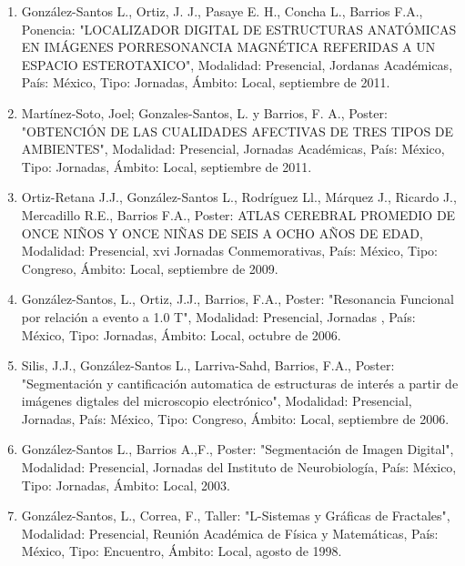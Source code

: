 \begin{enumerate}
\item  González-Santos L., Ortiz, J. J., Pasaye E. H., Concha L., Barrios F.A., Ponencia: "LOCALIZADOR DIGITAL DE ESTRUCTURAS 
ANATÓMICAS EN IMÁGENES PORRESONANCIA MAGNÉTICA REFERIDAS A UN ESPACIO ESTEROTAXICO", Modalidad: Presencial, Jordanas 
Académicas, País: México, Tipo: Jornadas, Ámbito: Local, septiembre de 2011.

\item  Martínez-Soto, Joel; Gonzales-Santos, L. y Barrios, F. A., Poster: "OBTENCIÓN DE LAS CUALIDADES AFECTIVAS DE TRES 
TIPOS DE 
AMBIENTES", Modalidad: Presencial, Jornadas Académicas, País: México, Tipo: Jornadas, Ámbito: Local, septiembre de 2011.

\item  Ortiz-Retana J.J., González-Santos L., Rodríguez Ll., Márquez J., Ricardo J., Mercadillo R.E., Barrios F.A., Poster: 
ATLAS 
CEREBRAL PROMEDIO DE ONCE NIÑOS Y ONCE NIÑAS DE SEIS A OCHO AÑOS DE EDAD, Modalidad: Presencial, xvi Jornadas Conmemorativas, 
País: México, Tipo: Congreso, Ámbito: Local, septiembre de 2009.

\item  González-Santos, L., Ortiz, J.J., Barrios, F.A., Poster: "Resonancia Funcional por relación a evento a 1.0 T", 
Modalidad: 
Presencial, Jornadas , País: México, Tipo: Jornadas, Ámbito: Local, octubre de 2006.

\item  Silis, J.J., González-Santos L., Larriva-Sahd, Barrios, F.A., Poster: "Segmentación y cantificación automatica de 
estructuras de interés a partir de imágenes digtales del microscopio electrónico", Modalidad: Presencial, Jornadas, País: 
México, Tipo: Congreso, Ámbito: Local, septiembre de 2006.

\item  González-Santos L., Barrios A.,F., Poster: "Segmentación de Imagen Digital", Modalidad: Presencial, Jornadas del 
Instituto de Neurobiología, País: México, Tipo: Jornadas, Ámbito: Local, 2003.

\item  González-Santos, L., Correa, F., Taller: "L-Sistemas y Gráficas de Fractales", Modalidad: Presencial, Reunión 
Académica 
de Física y Matemáticas, País: México, Tipo: Encuentro, Ámbito: Local, agosto de 1998.


\end{enumerate}

